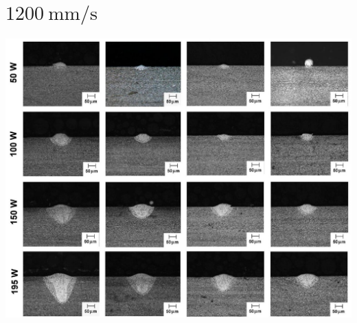 \documentclass[10pt]{article}
\begin{document}
\section*{$1200 \mathrm{~mm} / \mathrm{s}$}
\begin{center}
\includegraphics[max width=\textwidth]{2024_02_28_5b6806184856c64a957ag-05(1)}
\end{center}
\end{document}
